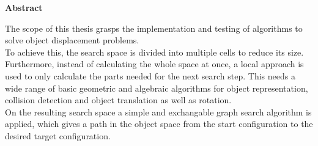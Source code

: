 




\pagestyle{headings}


\centerline{\bf Abstract}



%
\vskip 2cm
%


The scope of this thesis grasps the implementation and testing of algorithms to solve object displacement problems.\\
To achieve this, the search space is divided into multiple cells to reduce its size. Furthermore, instead of calculating the whole space at once, a local approach is used to only calculate the parts needed for the next search step. This needs a wide range of basic geometric and algebraic algorithms for object representation, collision detection and object translation as well as rotation.\\
On the resulting search space a simple and exchangable graph search algorithm is applied, which gives a path in the object space from the
start configuration to the desired target configuration.

%
%
%
%
%
